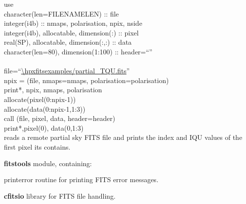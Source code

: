 \begin{example}
{%
use \\
character(len=FILENAMELEN) :: file\\
integer(i4b) :: nmaps, polarisation, npix, nside\\
integer(i4b), allocatable, dimension(:)   :: pixel\\
real(SP),     allocatable, dimension(:,:) :: data\\
character(len=80), dimension(1:100)       :: header=``''\\
\\
file=``\url{\hpxfitsexamples/partial\_TQU.fits}''\\
npix = (file, nmaps=nmaps, polarisation=polarisation)\\
print*, npix, nmaps, polarisation\\
allocate(pixel(0:npix-1))\\
allocate(data(0:npix-1,1:3))\\
call \thedocid(file, pixel, data, header=header)\\
print*,pixel(0), data(0,1:3)\\
}{
reads a remote partial sky FITS file and prints the index and IQU values of the first pixel its contains.
}
\end{example}
\begin{modules}
  \begin{sulist}{} %
  \item[\textbf{fitstools}] module, containing:
  \item[printerror] routine for printing FITS error messages.
  \item[\textbf{cfitsio}] library for FITS file handling.		
  \end{sulist}
\end{modules}

